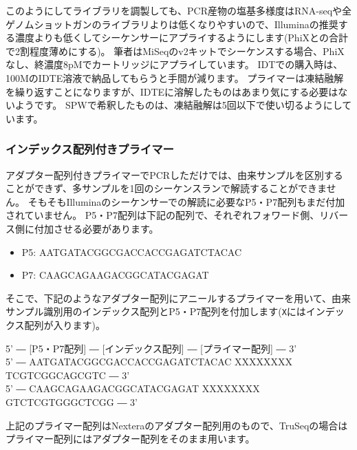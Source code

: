 \documentclass[titlepage,10pt,a4paper,uplatex]{jsbook}
\newenvironment{pre}{\begin{leftbar}\raggedright\ttfamily\footnotesize\setlength{\baselineskip}{1.4em}}{\end{leftbar}\vspace{-1em}}
\begin{document}
このようにしてライブラリを調製しても、PCR産物の塩基多様度はRNA-seqや全ゲノムショットガンのライブラリよりは低くなりやすいので、Illuminaの推奨する濃度よりも低くしてシーケンサーにアプライするようにします(PhiXとの合計で2割程度薄めにする)。
筆者はMiSeqのv2キットでシーケンスする場合、PhiXなし、終濃度8pMでカートリッジにアプライしています。
IDTでの購入時は、100{\textmu}MのIDTE溶液で納品してもらうと手間が減ります。
プライマーは凍結融解を繰り返すことになりますが、IDTEに溶解したものはあまり気にする必要はないようです\citep{Speicher2017}。
SPWで希釈したものは、凍結融解は5回以下で使い切るようにしています。

\subsubsection{インデックス配列付きプライマー}

アダプター配列付きプライマーでPCRしただけでは、由来サンプルを区別することができず、多サンプルを1回のシーケンスランで解読することができません。
そもそもIlluminaのシーケンサーでの解読に必要なP5・P7配列もまだ付加されていません。
P5・P7配列は下記の配列で、それぞれフォワード側、リバース側に付加させる必要があります。

\begin{itemize}
\item P5: AATGATACGGCGACCACCGAGATCTACAC
\item P7: CAAGCAGAAGACGGCATACGAGAT
\end{itemize}

そこで、下記のようなアダプター配列にアニールするプライマーを用いて、由来サンプル識別用のインデックス配列とP5・P7配列を付加します(\texttt{X}にはインデックス配列が入ります)。

\begin{pre}
5' ― [P5・P7配列] ― [インデックス配列] ― [プライマー配列] ― 3'\\
5' ― AATGATACGGCGACCACCGAGATCTACAC XXXXXXXX TCGTCGGCAGCGTC ― 3'\\
5' ― CAAGCAGAAGACGGCATACGAGAT XXXXXXXX GTCTCGTGGGCTCGG ― 3'
\end{pre}

上記のプライマー配列はNexteraのアダプター配列用のもので、TruSeqの場合はプライマー配列にはアダプター配列をそのまま用います。
\end{document}
